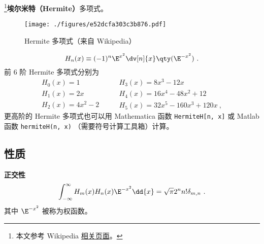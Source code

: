 
\begin{issues}
\issueDraft
\end{issues}

\footnote{本文参考 Wikipedia \href{https://en.wikipedia.org/wiki/Hermite_polynomials}{相关页面}。}\textbf{埃尔米特（Hermite）}多项式。

\begin{figure}[ht]
\centering
\texttt{[image: ./figures/e52dcfa303c3b876.pdf]}
\caption{Hermite 多项式（来自 Wikipedia）} \label{fig_HermiP_1}
\end{figure}

\begin{equation}
H_n(x) \equiv (- 1)^n \E^{x^2} \dv[n]{x} \qty(\E^{-x^2})~.
\end{equation}
前 6 阶 Hermite 多项式分别为
\begin{equation}
\begin{array}{l}
H_0(x) = 1\\
H_1(x) = 2x\\
H_2(x) = 4x^2 - 2
\end{array}
\qquad
\begin{array}{l}
H_3(x) = 8x^3 - 12x\\
H_4(x) = 16x^4 - 48x^2 + 12\\
H_5(x) = 32x^5 - 160x^3 + 120x~,
\end{array}
\end{equation}
更高阶的 Hermite 多项式也可以用 Mathematica 函数 \verb`HermiteH[n, x]` 或 Matlab 函数 \verb`hermiteH(n, x)` （需要符号计算工具箱）计算。

\subsection{性质}
\textbf{正交性}
\begin{equation}%
\int_{-\infty}^\infty H_m(x) H_n(x) \E^{-x^2} \dd{x} = \sqrt{\pi}2^n n! \delta_{m,n}~.
\end{equation}
其中 $\E^{-x^2}$ 被称为权函数。
